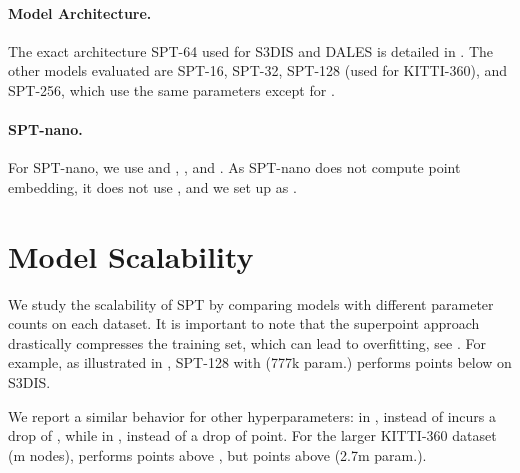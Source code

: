 \paragraph{Model Architecture.}{
The exact architecture SPT-64 used for S3DIS and DALES is detailed in .
The other models evaluated are SPT-16, SPT-32, SPT-128 (used for KITTI-360), and SPT-256, which use the same parameters except for . 

\paragraph{SPT-nano.} For SPT-nano, we use and , , and . As SPT-nano does not compute point embedding, it does not use , and we set up  as .
}

\section{Model Scalability}
\label{sec:scalingablation}

We study the scalability of SPT by comparing models with different parameter counts on each dataset. 
It is important to note that the superpoint approach drastically compresses the training set, which can lead to overfitting, see . 
For example, as illustrated in , SPT-128 with  (777k param.) performs  points below  on S3DIS. 

We report a similar behavior for other hyperparameters: in ,  instead of  incurs a drop of , while in ,  instead of  a drop of  point. For the larger KITTI-360 dataset (m nodes),  performs  points above , but  points above  (2.7m param.).

